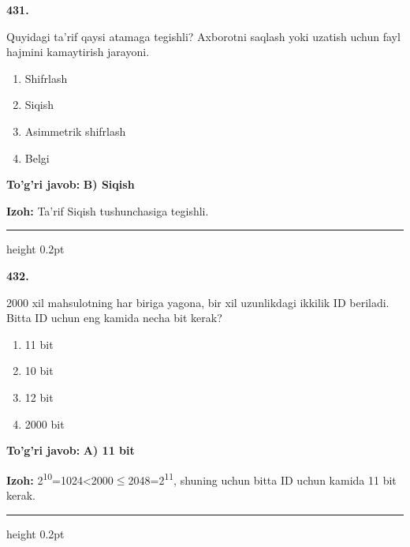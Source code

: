 \documentclass[10pt,a4paper,oneside]{article}
\begin{document}
\noindent\textbf{\color{ink}431.}
\par
Quyidagi ta'rif qaysi atamaga tegishli? Axborotni saqlash yoki uzatish uchun fayl hajmini kamaytirish jarayoni.
\begin{enumerate}[label=\Alph*),leftmargin=9mm]
\item Shifrlash
\item Siqish
\item Asimmetrik shifrlash
\item Belgi
\end{enumerate}
\begin{tcolorbox}[enhanced,breakable,colback=teal!4,colframe=teal!50!black,boxrule=0.5pt,arc=1.1mm,left=3mm,right=3mm,top=1.7mm,bottom=1.7mm,before skip=2mm,after skip=2mm]
\textbf{\color{teal}To'g'ri javob:} \textbf{B) Siqish}
\par\smallskip
\textbf{Izoh:} Ta'rif Siqish tushunchasiga tegishli.
\end{tcolorbox}
\vspace{2mm}\hrule height 0.2pt \vspace{3mm}

\noindent\textbf{\color{ink}432.}
\par
2000 xil mahsulotning har biriga yagona, bir xil uzunlikdagi ikkilik ID beriladi. Bitta ID uchun eng kamida necha bit kerak?
\begin{enumerate}[label=\Alph*),leftmargin=9mm]
\item 11 bit
\item 10 bit
\item 12 bit
\item 2000 bit
\end{enumerate}
\begin{tcolorbox}[enhanced,breakable,colback=teal!4,colframe=teal!50!black,boxrule=0.5pt,arc=1.1mm,left=3mm,right=3mm,top=1.7mm,bottom=1.7mm,before skip=2mm,after skip=2mm]
\textbf{\color{teal}To'g'ri javob:} \textbf{A) 11 bit}
\par\smallskip
\textbf{Izoh:} 2\textsuperscript{1}\textsuperscript{0}=1024\textless{}2000\ensuremath{\leq}2048=2\textsuperscript{1}\textsuperscript{1}, shuning uchun bitta ID uchun kamida 11 bit kerak.
\end{tcolorbox}
\vspace{2mm}\hrule height 0.2pt \vspace{3mm}
\end{document}
